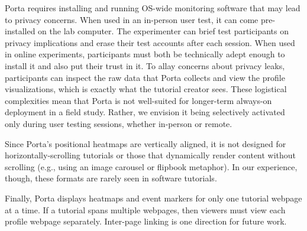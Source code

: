 Porta requires installing and running OS-wide monitoring software that
may lead to privacy concerns. When used in an in-person user test, it
can come pre-installed on the lab computer. The experimenter can brief
test participants on privacy implications and erase their test accounts
after each session. When used in online experiments, participants must
both be technically adept enough to install it and also put their trust
in it. To allay concerns about privacy leaks, participants can inspect
the raw data that Porta collects and view the profile visualizations,
which is exactly what the tutorial creator sees.
%
These logistical complexities mean that Porta is not well-suited for
longer-term always-on deployment in a field study. Rather, we envision it
being selectively activated only during user testing sessions, whether
in-person or remote.

Since Porta's positional heatmaps are vertically aligned, it is not
designed for horizontally-scrolling tutorials or those that
dynamically render content without scrolling (e.g.,
using an image carousel or flipbook metaphor). In our experience,
though, these formats are rarely seen in software tutorials.

Finally, Porta displays heatmaps and event markers for only one tutorial
webpage at a time. If a tutorial spans multiple webpages, then viewers
must view each profile webpage separately. Inter-page linking is one
direction for future work.



